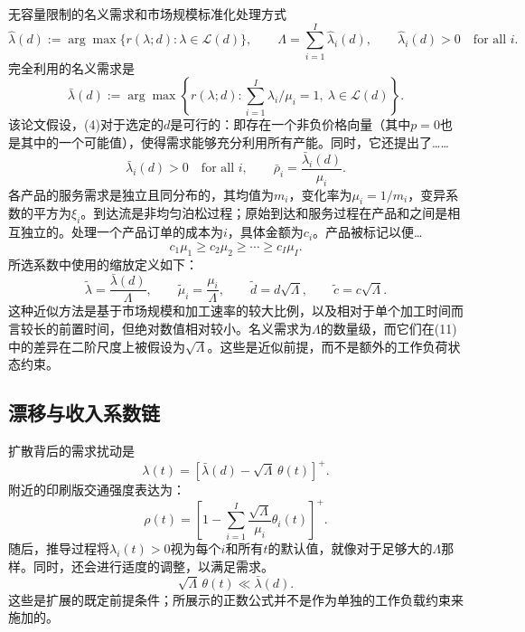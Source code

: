 \documentclass[11pt]{article}
\begin{document}
无容量限制的名义需求和市场规模标准化处理方式
\[
\hat\lambda(d):=\arg\max\{r(\lambda;d):\lambda\in\mathcal L(d)\},
\qquad
\Lambda=\sum_{i=1}^I\hat\lambda_i(d),
\qquad
\hat\lambda_i(d)>0\quad\text{for all }i.
\]
完全利用的名义需求是
\begin{equation}
\bar\lambda(d):=\arg\max\left\{
 r(\lambda;d):\sum_{i=1}^I\lambda_i/\mu_i=1,
 \ \lambda\in\mathcal L(d)\right\}.
\tag{4}
\end{equation}
该论文假设，(4)对于选定的\(d\)是可行的：即存在一个非负价格向量（其中\(p=0\)也是其中的一个可能值），使得需求能够充分利用所有产能。同时，它还提出了……
\[
\bar\lambda_i(d)>0\quad\text{for all }i,
\qquad
\bar\rho_i=\frac{\bar\lambda_i(d)}{\mu_i}.
\]
各产品的服务需求是独立且同分布的，其均值为\(m_i\)，变化率为\(\mu_i=1/m_i\)，变异系数的平方为\(\xi_i\)。到达流是非均匀泊松过程；原始到达和服务过程在产品和之间是相互独立的。处理一个产品订单的成本为\(i\)，具体金额为\(c_i\)。产品被标记以便…
\[
c_1\mu_1\geq c_2\mu_2\geq\cdots\geq c_I\mu_I.
\]
所选系数中使用的缩放定义如下：
\[
\tilde\lambda=\frac{\bar\lambda(d)}{\Lambda},
\qquad \tilde\mu_i=\frac{\mu_i}{\Lambda},
\qquad \tilde d=d\sqrt\Lambda,
\qquad \tilde c=c\sqrt\Lambda.
\]
这种近似方法是基于市场规模和加工速率的较大比例，以及相对于单个加工时间而言较长的前置时间，但绝对数值相对较小。名义需求为\(\Lambda\)的数量级，而它们在(11)中的差异在二阶尺度上被假设为\(\sqrt\Lambda\)。这些是近似前提，而不是额外的工作负荷状态约束。

\subsection*{漂移与收入系数链}

扩散背后的需求扰动是
\begin{equation}
\lambda(t)=[\bar\lambda(d)-\sqrt\Lambda\,\theta(t)]^+.
\tag{5}
\end{equation}
附近的印刷版交通强度表达为：
\[
\rho(t)=\left[1-\sum_{i=1}^I
\frac{\sqrt\Lambda}{\mu_i}\theta_i(t)\right]^+.
\]
随后，推导过程将\(\lambda_i(t)>0\)视为每个\(i\)和所有\(t\)的默认值，就像对于足够大的\(\Lambda\)那样。同时，还会进行适度的调整，以满足需求。
\[
\sqrt\Lambda\,\theta(t)\ll\bar\lambda(d).
\]
这些是扩展的既定前提条件；所展示的正数公式并不是作为单独的工作负载约束来施加的。
\end{document}
